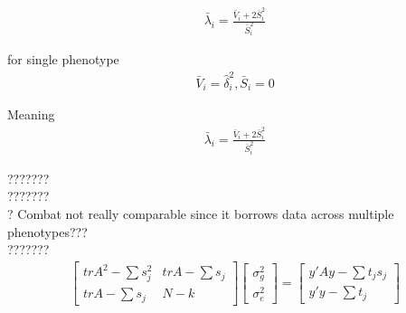 \documentclass{article}
\begin{document}
\begin{align*}
	\bar \lambda_i = \frac{\bar V_i + 2\bar S_i^2 }{\bar S_i^2}
\end{align*}

for single phenotype 
\begin{align*}
	\bar V_i = \hat \delta_i^2, \bar S_i = 0
\end{align*}

Meaning 
\begin{align*}
	\bar \lambda_i = \frac{\bar V_i + 2\bar S_i^2 }{\bar S_i^2}
\end{align*}


??????? \\
??????? \\
? Combat not really comparable since it borrows data across multiple phenotypes??? \\
???????\\



\begin{align*}
	\begin{bmatrix}
		tr A^2 - \sum s_j^2 & trA - \sum s_j \\
		trA - \sum s_j & N-k 
	\end{bmatrix}
	\begin{bmatrix}
	\sigma_g^2 \\ 
	\sigma_e^2 
	\end{bmatrix} = 
	\begin{bmatrix}
		y' Ay - \sum t_j s_j \\
		y'y - \sum t_j
	\end{bmatrix}
\end{align*}
\end{document}
